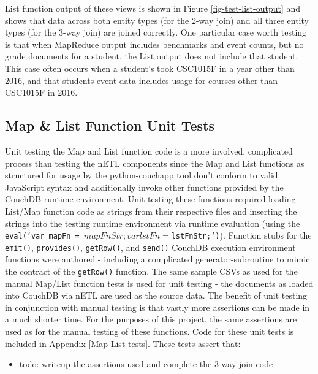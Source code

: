 List function output of these views is shown in Figure \ref{fig-test-list-output} and shows that data across both entity types (for the 2-way join) and all three entity types (for the 3-way join) are joined correctly. One particular case worth testing is that when MapReduce output includes benchmarks and event counts, but no grade documents for a student, the List output does not include that student. This case often occurs when a student's took CSC1015F in a year other than 2016, and that students event data includes usage for courses other than CSC1015F in 2016.

\newpage



\subsection{Map \& List Function Unit Tests}
Unit testing the Map and List function code is a more involved, complicated process than testing the nETL components since the Map and List functions as structured for usage by the python-couchapp tool don't conform to valid JavaScript syntax and additionally invoke other functions provided by the CouchDB runtime environment. Unit testing these functions required loading List/Map function code as strings from their respective files and inserting the strings into the testing runtime environment via runtime evaluation (using the \texttt{eval(`var mapFn = ${mapFnStr}; var lstFn = ${lstFnStr};`)}). Function stubs for the \texttt{emit()}, \texttt{provides()}, \texttt{getRow()}, and \texttt{send()} CouchDB execution environment functions were authored - including a complicated generator-subroutine to mimic the contract of the \texttt{getRow()} function. The same sample CSVs as used for the manual Map/List function tests is used for unit testing - the documents as loaded into CouchDB via nETL are used as the source data. The benefit of unit testing in conjunction with manual testing is that vastly more assertions can be made in a much shorter time. For the purposes of this project, the same assertions are used as for the manual testing of these functions. Code for these unit tests is included in Appendix \ref{Map-List-tests}. These tests assert that:

\begin{itemize}
  \item todo: writeup the assertions used and complete the 3 way join code
\end{itemize}